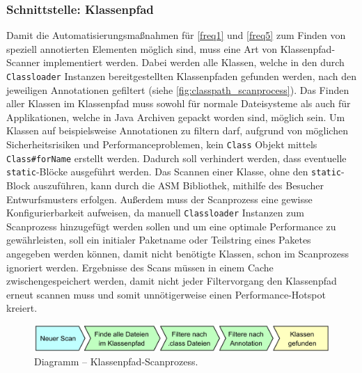 \subsubsection{Schnittstelle: Klassenpfad}
\label{classpath_interface}
Damit die Automatisierungsmaßnahmen für \autoref{freq1} und \autoref{freq5} zum Finden von speziell annotierten Elementen möglich sind, muss eine Art von Klassenpfad-Scanner implementiert werden. Dabei werden alle Klassen, welche in den durch \texttt{Classloader} Instanzen bereitgestellten Klassenpfaden gefunden werden, nach den jeweiligen Annotationen gefiltert (siehe \autoref{fig:classpath_scanprocess}). Das Finden aller Klassen im Klassenpfad muss sowohl für normale Dateisysteme als auch für Applikationen, welche in Java Archiven gepackt worden sind, möglich sein. Um Klassen auf beispielsweise Annotationen zu filtern darf, aufgrund von möglichen Sicherheitsrisiken und Performanceproblemen, kein \texttt{Class} Objekt mittels \texttt{Class\#forName} erstellt werden. Dadurch soll verhindert werden, dass eventuelle \texttt{static}-Blöcke ausgeführt werden. Das Scannen einer Klasse, ohne den \texttt{static}-Block auszuführen, kann durch die ASM Bibliothek, mithilfe des Besucher Entwurfsmusters erfolgen. Außerdem muss der Scanprozess eine gewisse Konfigurierbarkeit aufweisen, da manuell \texttt{Classloader} Instanzen zum Scanprozess hinzugefügt werden sollen und um eine optimale Performance zu gewährleisten, soll ein initialer Paketname oder Teilstring eines Paketes angegeben werden können, damit nicht benötigte Klassen, schon im Scanprozess ignoriert werden. Ergebnisse des Scans müssen in einem Cache zwischengespeichert werden, damit nicht jeder Filtervorgang den Klassenpfad erneut scannen muss und somit unnötigerweise einen Performance-Hotspot kreiert.
\begin{figure}[H]
	\centering
	\includegraphics[width=\textwidth]{Abbildungen/Klassenpfad Scanprozess.png}
	\caption{Diagramm -- Klassenpfad-Scanprozess.}
	\label{fig:classpath_scanprocess}
\end{figure}
